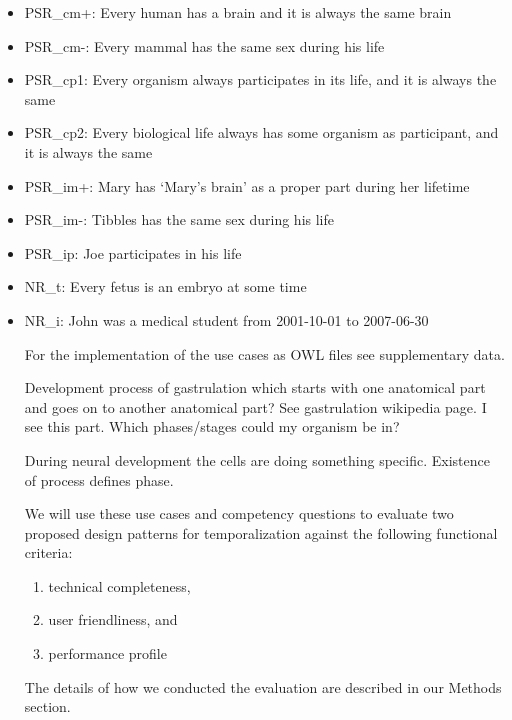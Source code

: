 \begin{itemize}
\item PSR\_cm+: Every human has a brain and it is always the same brain
\item PSR\_cm-: Every mammal has the same sex during his life 
\item PSR\_cp1: Every organism always participates in its life, and it is always the same
\item PSR\_cp2: Every biological life always has some organism as participant, and it is always the same
\item PSR\_im+: Mary has `Mary's brain' as a proper part during her lifetime 
\item PSR\_im-: Tibbles has the same sex during his life 
\item PSR\_ip: Joe participates in his life

\item NR\_t: Every fetus is an embryo at some time
\item NR\_i: John was a medical student from 2001-10-01 to 2007-06-30

For the implementation of the use cases as OWL files see supplementary data.




Development process of gastrulation which starts with one anatomical part and goes on to another anatomical part? See gastrulation wikipedia page. 
I see this part. Which phases/stages could my organism be in?

During neural development the cells are doing something specific. Existence of process defines phase.


We will use these use cases and competency questions to evaluate two proposed design patterns for temporalization against the following functional criteria:
\begin{enumerate}
    \item technical completeness, 
    \item user friendliness, and
    \item performance profile
\end{enumerate}
The details of how we conducted the evaluation are described in our Methods section.

\end{itemize}




 
